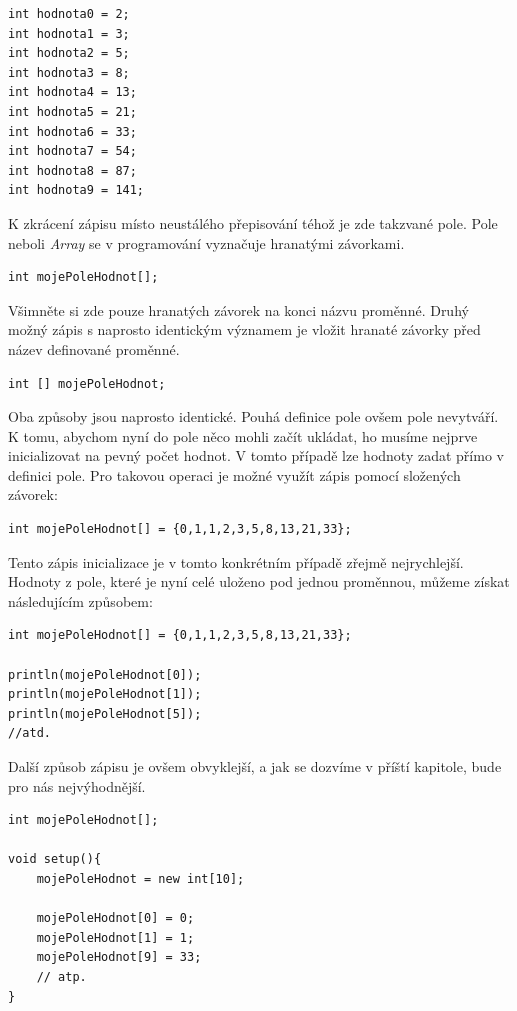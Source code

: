 \documentclass[10pt,twoside=true,open=right,cleardoublepage=empty,chapterprefix=true]{scrbook}
\begin{document}
\begin{lstlisting}
int hodnota0 = 2;
int hodnota1 = 3;
int hodnota2 = 5;
int hodnota3 = 8;
int hodnota4 = 13;
int hodnota5 = 21;
int hodnota6 = 33;
int hodnota7 = 54;
int hodnota8 = 87;
int hodnota9 = 141;
\end{lstlisting}


K zkrácení zápisu místo neustálého přepisování téhož je zde takzvané pole. Pole neboli {\em Array} se v programování vyznačuje hranatými závorkami.

\begin{lstlisting}
int mojePoleHodnot[];
\end{lstlisting}

Všimněte si zde pouze hranatých závorek na konci názvu proměnné. Druhý možný zápis s naprosto identickým významem je vložit hranaté závorky před název definované proměnné.


\begin{lstlisting}
int [] mojePoleHodnot;
\end{lstlisting}

Oba způsoby jsou naprosto identické. Pouhá definice pole ovšem pole nevytváří. K tomu, abychom nyní do pole něco mohli začít ukládat, ho musíme nejprve inicializovat na pevný počet hodnot. V tomto případě lze hodnoty zadat přímo v definici pole. Pro takovou operaci je možné využít zápis pomocí složených závorek:

\begin{lstlisting}
int mojePoleHodnot[] = {0,1,1,2,3,5,8,13,21,33};
\end{lstlisting}

Tento zápis inicializace je v tomto konkrétním případě zřejmě nejrychlejší. Hodnoty z pole, které je nyní celé uloženo pod jednou proměnnou, můžeme získat následujícím způsobem:

\begin{lstlisting}
int mojePoleHodnot[] = {0,1,1,2,3,5,8,13,21,33};

println(mojePoleHodnot[0]);
println(mojePoleHodnot[1]);
println(mojePoleHodnot[5]);
//atd.
\end{lstlisting}


Další způsob zápisu je ovšem obvyklejší, a jak se dozvíme v příští kapitole, bude pro nás nejvýhodnější.


\begin{lstlisting}
int mojePoleHodnot[];

void setup(){
	mojePoleHodnot = new int[10];
	
	mojePoleHodnot[0] = 0;
	mojePoleHodnot[1] = 1;
	mojePoleHodnot[9] = 33;
	// atp.
}
\end{lstlisting}
\end{document}
